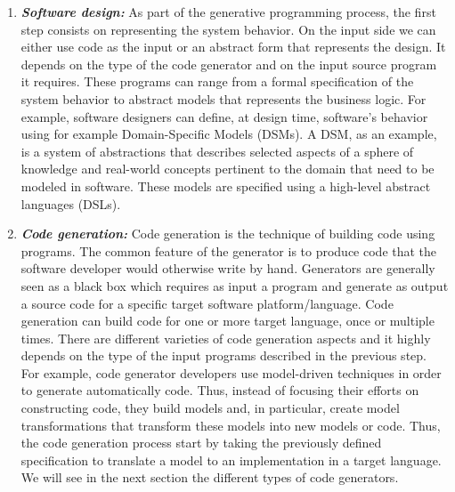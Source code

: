 \begin{enumerate}
\item \textbf{\textit{Software design:}} 
As part of the generative programming process, the first step consists on representing the system behavior. 
On the input side we can either use code as the input or an abstract form that represents the design. It depends on the type of the code generator and on the input source program it requires. These programs can range from a formal specification of the system behavior to abstract models that represents the business logic.
For example, software designers can define, at design time, software’s behavior using for example Domain-Specific Models (DSMs).
A DSM, as an example, is a system of abstractions that describes selected aspects of a sphere of knowledge and real-world concepts pertinent to the domain that need to be modeled in software. These models are specified using a high-level abstract languages (DSLs). %

\item \textbf{\textit{Code generation:}} 
Code generation is the technique of building code using programs. The common feature of the generator is to produce code that the software developer would otherwise write by hand.
Generators are generally seen as a black box which requires as input a program and generate as output a source code for a specific target software platform/language. %
Code generation can build code for one or more target language, once or multiple times. There are different varieties of code generation aspects and it highly depends on the type of the input programs described in the previous step. 
For example, code generator developers use model-driven techniques in order to generate automatically code. Thus, instead of focusing their efforts on constructing code, they build models and, in particular, create model transformations that transform these models into new models or code. Thus, the code generation process start by taking the previously defined specification to translate a model to an implementation in a target language. We will see in the next section the different types of code generators.



\end{enumerate}
